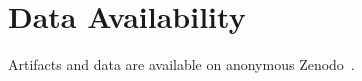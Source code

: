 \documentclass[conference]{IEEEtran}
\begin{document}
\section{Data Availability} Artifacts and data are available on anonymous Zenodo~\cite{morph-artifact}.



 
\end{document}
